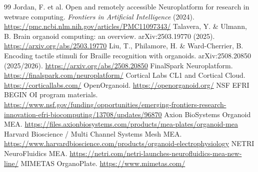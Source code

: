 \documentclass[10pt,twocolumn]{article}
\begin{document}
\begin{thebibliography}{99}
 Jordan, F. et al. Open and remotely accessible Neuroplatform for research in wetware computing. \emph{Frontiers in Artificial Intelligence} (2024). \url{https://pmc.ncbi.nlm.nih.gov/articles/PMC11097343/}
 Talavera, Y. \& Ulmann, B. Brain organoid computing: an overview. arXiv:2503.19770 (2025). \url{https://arxiv.org/abs/2503.19770}
 Liu, T., Philamore, H. \& Ward-Cherrier, B. Encoding tactile stimuli for Braille recognition with organoids. arXiv:2508.20850 (2025/2026). \url{https://arxiv.org/abs/2508.20850}
 FinalSpark Neuroplatform. \url{https://finalspark.com/neuroplatform/}
 Cortical Labs CL1 and Cortical Cloud. \url{https://corticallabs.com/}
 OpenOrganoid. \url{https://openorganoid.org/}
 NSF EFRI BEGIN OI program materials. \url{https://www.nsf.gov/funding/opportunities/emerging-frontiers-research-innovation-efri-biocomputing/13708/updates/96870}
 Axion BioSystems Organoid MEA. \url{https://files.axionbiosystems.com/products/mea-plates/organoid-mea}
 Harvard Bioscience / Multi Channel Systems Mesh MEA. \url{https://www.harvardbioscience.com/products/organoid-electrophysiology}
 NETRI NeuroFluidics MEA. \url{https://netri.com/netri-launches-neurofluidics-mea-new-line/}
 MIMETAS OrganoPlate. \url{https://www.mimetas.com/}

\end{thebibliography}
\end{document}
